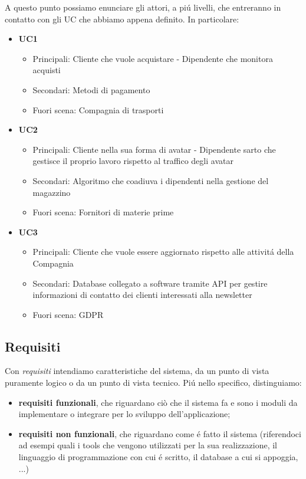 \documentclass[12pt]{article}
\begin{document}
A questo punto possiamo enunciare gli attori, a pi\'u livelli, che entreranno in contatto con gli UC che abbiamo appena definito. In particolare:
\begin{itemize}
	\item \textbf{UC1}
		\begin{itemize}
		\item Principali: Cliente che vuole acquistare - Dipendente che monitora acquisti 
		\item Secondari: Metodi di pagamento
		\item Fuori scena: Compagnia di trasporti 
		\end{itemize}
	\item \textbf{UC2}
		\begin{itemize}
		\item Principali: Cliente nella sua forma di avatar - Dipendente sarto che gestisce il proprio lavoro rispetto al traffico degli avatar 
		\item Secondari: Algoritmo che coadiuva i dipendenti nella gestione del magazzino
		\item Fuori scena: Fornitori di materie prime 
		\end{itemize}
	\item \textbf{UC3}
		\begin{itemize}
		\item Principali: Cliente che vuole essere aggiornato rispetto alle attivit\'a della Compagnia 
		\item Secondari: Database collegato a software tramite API per gestire informazioni di contatto dei clienti interessati alla newsletter 
		\item Fuori scena: GDPR
		\end{itemize}
\end{itemize}

\subsection{Requisiti}

Con \textit{requisiti} intendiamo caratteristiche del sistema, da un punto di vista puramente logico o da un punto di vista tecnico. Pi\'u nello specifico, distinguiamo: 
\begin{itemize}
	\item \textbf{requisiti funzionali}, che riguardano ciò che il sistema fa e sono i moduli da implementare o integrare per lo sviluppo dell’applicazione;
	\item \textbf{requisiti non funzionali}, che riguardano come \'e fatto il sistema (riferendoci ad esempi quali i tools che vengono utilizzati per la sua realizzazione, il linguaggio di programmazione con cui \'e scritto, il database a cui si appoggia, ...)
\end{itemize}
\end{document}
